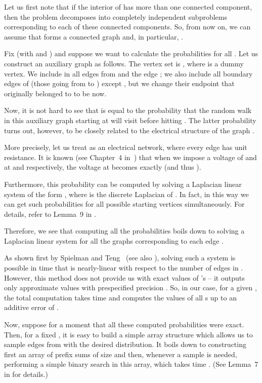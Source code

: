 \documentclass[11pt, letterpaper]{article}
\begin{document}
Let us first note that if the interior  of  has more than one connected component, then the problem decomposes into completely independent subproblems corresponding to each of these connected components. So, from now on, we can assume that  forms a connected graph and, in particular, . 

Fix  (with  and ) and suppose we want to calculate the probabilities  for all . Let us construct an auxiliary graph  as follows. The vertex set is , where  is a dummy vertex. We include in  all edges from  and the edge ; we also include all boundary edges of  (those going from  to ) except , but we change their endpoint that originally belonged to   to be  now.

Now, it is not hard to see that  is equal to the probability  that the random walk in this auxiliary graph starting at  will visit  before hitting . The latter probability turns out, however, to be closely related to the electrical structure of the graph . 

More precisely, let us treat  as an electrical network, where every edge has unit resistance. It is known (see Chapter~4 in~\cite{Lovasz93}) that when we impose a voltage of  and  at  and  respectively, the voltage at  becomes exactly  (and thus ). 

Furthermore, this probability  can be computed by solving a Laplacian linear system of the form , where  is the discrete Laplacian of . In fact, in this way we can get such probabilities  for all possible starting vertices  simultaneously. For details, refer to Lemma~9 in \cite{KelnerM09}.

Therefore, we see that computing all the probabilities  boils down to solving a Laplacian linear system  for all the graphs  corresponding to each edge .

As shown first by Spielman and Teng~\cite{SpielmanT04} (see also \cite{KoutisMP10,KoutisMP11,KelnerOSZ13}), solving such a system is possible in time that is nearly-linear with respect to the number of edges in . However, this method does not provide us with exact values of 's -- it outputs only approximate values with prespecified precision . So, in our case, for a given , the total computation takes  time and computes the values of all s up to an additive error of .

Now, suppose for a moment that all these computed probabilities were exact. Then, for a fixed , it is easy to build a simple array structure which allows us to sample edges from  with the desired distribution. It boils down to constructing first an array of prefix sums of size  and then, whenever a sample is needed, performing  a simple binary search in this array, which takes time . (See Lemma~7 in \cite{KelnerM09} for details.)
\end{document}
